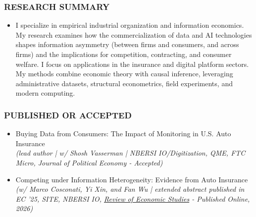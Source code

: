 \subsubsection*{RESEARCH SUMMARY}
\begin{itemize}
    \item[] I specialize in empirical industrial organization and information economics. My research examines how the commercialization of data and AI technologies shapes information asymmetry (between firms and consumers, and across firms) and the implications for competition, contracting, and consumer welfare.
    I focus on applications in the insurance and digital platform sectors. My methods combine economic theory with causal inference, leveraging administrative datasets, structural econometrics, field experiments, and modern computing.
\end{itemize}
\subsubsection*{PUBLISHED OR ACCEPTED}
\begin{itemize}
\setlength{\itemindent}{-.1in}
\item Buying Data from Consumers: The Impact of Monitoring in U.S. Auto Insurance \\
\textit{(lead author | w/ Shosh Vasserman | NBERSI IO/Digitization, QME, FTC Micro, \textit{Journal of Political Economy} - Accepted)}
\item Competing under Information Heterogeneity: Evidence from Auto Insurance \\
\textit{(w/ Marco Cosconati, Yi Xin, and Fan Wu | extended abstract published in EC '25, SITE, NBERSI IO, \href{https://doi.org/10.1093/restud/rdag058}{\textit{Review of Economic Studies}} - Published Online, 2026)}
\end{itemize}

